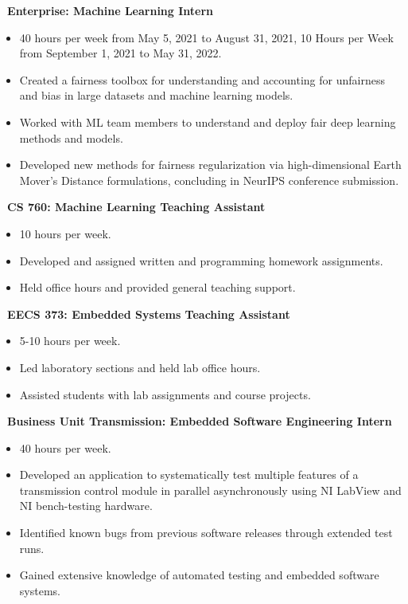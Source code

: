 \documentclass[]{article}
\begin{document}
 \newline
{\bf \ Enterprise: Machine Learning Intern}
\begin{itemize}[label={$\bullet$}]
	\item 40 hours per week from May 5, 2021 to August 31, 2021, 10 Hours per Week from September 1, 2021 to May 31,  2022.
	\item Created a fairness toolbox for understanding and accounting for unfairness and bias in large datasets and machine learning models.
	\item Worked with ML team members to understand and deploy fair deep learning methods and models.
	\item Developed new methods for fairness regularization via high-dimensional Earth Mover's Distance formulations, concluding in NeurIPS conference submission.
\end{itemize}

 \newline
{\bf \ CS 760: Machine Learning Teaching Assistant}
\begin{itemize}[label={$\bullet$}]
	\item 10 hours per week.
	\item Developed and assigned written and programming homework assignments.
	\item Held office hours and provided general teaching support.
\end{itemize} 

\clearpage
{} \newline
{\bf \ EECS 373: Embedded Systems Teaching Assistant}
\begin{itemize}[label={$\bullet$}]
	\item 5-10 hours per week.
	\item Led laboratory sections and held lab office hours.
	\item Assisted students with lab assignments and course projects.
\end{itemize}

 \newline
{\bf \ Business Unit Transmission: Embedded Software Engineering Intern}
\begin{itemize}[label={$\bullet$}]
	\item 40 hours per week.
	\item Developed an application to systematically test multiple features of a transmission control module in parallel asynchronously using NI LabView and NI bench-testing hardware.
	\item Identified known bugs from previous software releases through extended test runs.
	\item Gained extensive knowledge of automated testing and embedded software systems.
\end{itemize}
\end{document}
